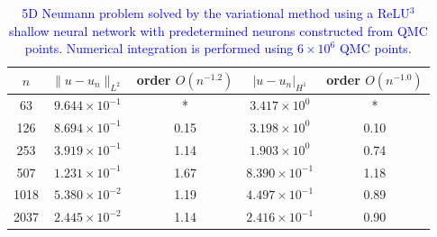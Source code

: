 \documentclass{article}
\theoremstyle{remark}
\begin{document}
\begin{table}[H]
    \centering
    {\color{blue}
    \begin{tabular}{c|c|c|c|c}
    $n$ & $\|u-u_n\|_{L^2}$ & order $O(n^{-1.2})$ & $|u-u_n|_{H^1}$ & order $O(n^{-1.0})$ \\ \hline \hline
    63   & $9.644\times10^{-1}$ & *    & $3.417\times10^{0}$ & *    \\ \hline
    126  & $8.694\times10^{-1}$ & 0.15 & $3.198\times10^{0}$ & 0.10 \\ \hline
    253  & $3.919\times10^{-1}$ & 1.14 & $1.903\times10^{0}$ & 0.74 \\ \hline
    507  & $1.231\times10^{-1}$ & 1.67 & $8.390\times10^{-1}$ & 1.18 \\ \hline
    1018 & $5.380\times10^{-2}$ & 1.19 & $4.497\times10^{-1}$ & 0.89 \\ \hline
    2037 & $2.445\times10^{-2}$ & 1.14 & $2.416\times10^{-1}$ & 0.90 \\ \hline
    \end{tabular}
    \caption{\textcolor{blue}{5D Neumann problem solved by the variational method using a ReLU$^3$ shallow neural network with predetermined neurons constructed from QMC points. Numerical integration is performed using $6\times 10^6$ QMC points.}}
    \label{tab:Neuman-RFM-ex1-5d-qmc}
    }
\end{table}




\end{document}
